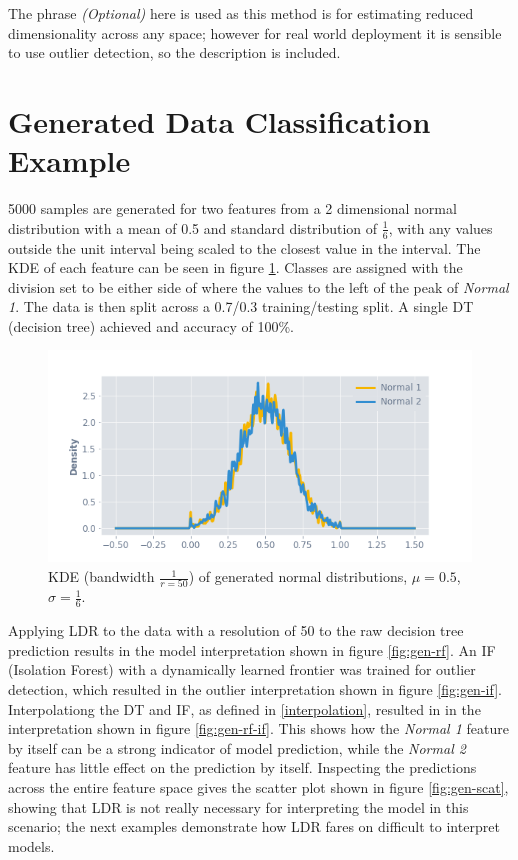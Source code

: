 \documentclass[a4paper, twocolumn]{article}
\begin{document}
The phrase \textit{(Optional)} here is used as this method is for estimating reduced dimensionality across any space; however for real world deployment it is sensible to use outlier detection, so the description is included.

\section{Generated Data Classification Example}

5000 samples are generated for two features from a 2 dimensional normal distribution with a mean of 0.5 and standard distribution of $\frac{1}{6}$, with any values outside the unit interval being scaled to the closest value in the interval. The KDE of each feature can be seen in figure \ref{fig:gen-kde}. Classes are assigned with the division set to be either side of where the values to the left of the peak of \textit{Normal 1}. The data is then split across a 0.7/0.3 training/testing split. A single DT (decision tree) achieved and accuracy of 100\%. 

\begin{figure}
\centering
\includegraphics[width=0.8\columnwidth]{img/gen_kde.png}
\caption{KDE (bandwidth $\frac{1}{r = 50}$) of generated normal distributions, $\mu = 0.5$, $\sigma = \frac{1}{6}$.}
\label{fig:gen-kde}
\end{figure}

Applying LDR to the data with a resolution of 50 to the raw decision tree prediction results in the model interpretation shown in figure \ref{fig:gen-rf}. An IF (Isolation Forest) \cite{liu2008isolation} with a dynamically learned frontier was trained for outlier detection, which resulted in the outlier interpretation shown in figure \ref{fig:gen-if}. Interpolationg the DT and IF, as defined in \ref{interpolation}, resulted in in the interpretation shown in figure \ref{fig:gen-rf-if}. This shows how the \textit{Normal 1} feature by itself can be a strong indicator of model prediction, while the \textit{Normal 2} feature has little effect on the prediction by itself. Inspecting the predictions across the entire feature space gives the scatter plot shown in figure \ref{fig:gen-scat}, showing that LDR is not really necessary for interpreting the model in this scenario; the next examples demonstrate how LDR fares on difficult to interpret models.
\end{document}
